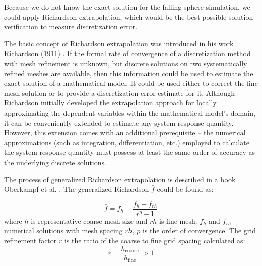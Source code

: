 Because we do not know the exact solution for the falling sphere simulation, we could apply Richardson extrapolation, which would be the best possible solution verification to measure discretization error.

The basic concept of  Richardson extrapolation was introduced in his work Richardson (1911) \cite{richardson1911}. If the formal rate of convergence of a discretization method with mesh refinement is unknown, but discrete solutions on two systematically refined meshes are available, then this information could be used to estimate the exact solution of a mathematical model. It could be used either to correct the fine mesh solution or to provide a discretization error estimate for it. Although Richardson initially developed the extrapolation approach for locally approximating the dependent variables within the mathematical model's domain, it can be conveniently extended to estimate any system response quantity. However, this extension comes with an additional prerequisite – the numerical approximations (such as integration, differentiation, etc.) employed to calculate the system response quantity must possess at least the same order of accuracy as the underlying discrete solutions.

The process of generalized Richardson extrapolation is described in a book Oberkampf et al. \cite{oberkampf}. The generalized Richardson $\bar{f}$ could be found as:

\begin{equation}
\bar{f}=f_h+\frac{f_h-f_{r h}}{r^p-1}
\end{equation}
where $h$ is representative coarse mesh size and $rh$ is fine mesh. $f_h$ and $f_{rh}$ numerical solutions with mesh spacing $rh$, $p$ is the order of convergence. The grid refinement factor $r$ is the ratio of the coarse to fine grid spacing calculated as:
\begin{equation}
r=\frac{h_{\text {coarse }}}{h_{\text {fine }}}>1
\end{equation}

